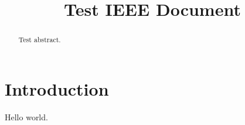 \documentclass[conference]{IEEEtran}
\begin{document}
\title{Test IEEE Document}
\author{
}
\maketitle
\begin{abstract}
Test abstract.
\end{abstract}
\section{Introduction}
Hello world.
\end{document}
